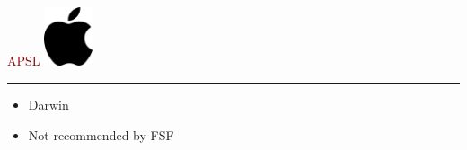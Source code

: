 \documentclass[c]{beamer}
\newcommand{\TITLE}{\fontsize{50pt}{1em}\selectfont}
\begin{document}
  \begin{frame}
    \textcolor{darkred}{{\TITLE APSL}}
    \hfill \includegraphics[width=40pt]{apple} \\
    \vspace{1em} \hrule \vspace{1em}
    \LARGE
    \begin{itemize}
    \item Darwin
    \item Not recommended by FSF
    \end{itemize}
  \end{frame}

\end{document}
